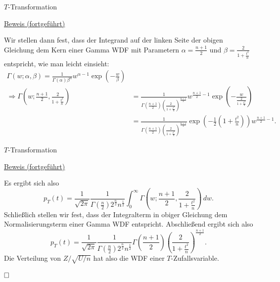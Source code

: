 \documentclass[
  8pt,
  ignorenonframetext,
]{beamer}
\begin{document}
\begin{frame}{\(T\)-Transformation}
\protect\hypertarget{t-transformation-7}{}
\footnotesize

\underline{Beweis (fortgeführt)} \vspace{1mm}

Wir stellen dann fest, dass der Integrand auf der linken Seite der
obigen Gleichung dem Kern einer Gamma WDF mit Parametern
\(\alpha = \frac{n+1}{2}\) und \(\beta = \frac{2}{1+\frac{t^2}{n}}\)
entspricht, wie man leicht einsieht: \begin{align*}
\Gamma(w;\alpha,\beta)
= \frac{1}{\Gamma(\alpha)\beta^{\alpha}}w^{\alpha-1}\exp\left(-\frac{w}{\beta}\right) & \\
\Rightarrow
\Gamma\left(w;\frac{n+1}{2},\frac{2}{1+\frac{t^2}{n}}\right)
& = \frac{1}{\Gamma(\frac{n+1}{2})\left(\frac{2}{1+\frac{t^2}{n}}\right)^{\frac{n+1}{2}}}
w^{\frac{n+1}{2}-1}\exp\left(-\frac{w}{\frac{2}{1+\frac{t^2}{n}}}\right) \\
& = \frac{1}{\Gamma( \frac{n+1}{2})\left(\frac{2}{1+\frac{t^2}{n}}\right)^{ \frac{n+1}{2}}}
\exp\left(-\frac{1}{2}\left(1 + \frac{t^2}{n}\right)\right) w^{\frac{n+1}{2}-1}.
\end{align*}
\end{frame}

\begin{frame}{\(T\)-Transformation}
\protect\hypertarget{t-transformation-8}{}
\footnotesize

\underline{Beweis (fortgeführt)} \vspace{1mm}

Es ergibt sich also \begin{equation}
p_T(t)
=
\frac{1}{\sqrt{2\pi}}\frac{1}{\Gamma(\frac{n}{2})2^{\frac{n}{2}}n^{\frac{1}{2}}}
\int_0^\infty
\Gamma\left(w;\frac{n+1}{2},\frac{2}{1+\frac{t^2}{n}}\right)
\,dw .
\end{equation} Schließlich stellen wir fest, dass der Integralterm in
obiger Gleichung dem Normalisierungsterm einer Gamma WDF entspricht.
Abschließend ergibt sich also \begin{equation}
p_T(t) =
\frac{1}{\sqrt{2\pi}}\frac{1}{\Gamma(\frac{n}{2})2^{\frac{n}{2}}n^{\frac{1}{2}}}
\Gamma\left(\frac{n+1}{2}\right)\left(\frac{2}{1 + \frac{t^2}{n}} \right)^{\frac{n+1}{2}}.
\end{equation} Die Verteilung von \(Z/\sqrt{U/n}\) hat also die WDF
einer \(T\)-Zufallsvariable.

\(\hfill \Box\)
\end{frame}
\end{document}

